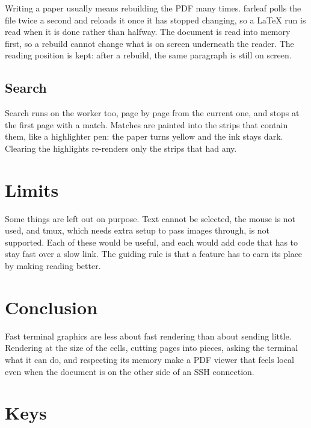 \documentclass[12pt]{article}
\begin{document}
Writing a paper usually means rebuilding the PDF many times. farleaf polls the
file twice a second and reloads it once it has stopped changing, so a LaTeX
run is read when it is done rather than halfway. The document is read into
memory first, so a rebuild cannot change what is on screen underneath the
reader. The reading position is kept: after a rebuild, the same paragraph is
still on screen.

\subsection{Search}

Search runs on the worker too, page by page from the current one, and stops
at the first page with a match. Matches are painted into the strips that
contain them, like a highlighter pen: the paper turns yellow and the ink stays
dark. Clearing the highlights re-renders only the strips that had any.

\section{Limits}

Some things are left out on purpose. Text cannot be selected, the mouse is not
used, and tmux, which needs extra setup to pass images through, is not
supported. Each of these would be useful, and each would add code that has to
stay fast over a slow link. The guiding rule is that a feature has to earn its
place by making reading better.

\section{Conclusion}

Fast terminal graphics are less about fast rendering than about sending
little. Rendering at the size of the cells, cutting pages into pieces, asking
the terminal what it can do, and respecting its memory make a PDF viewer that
feels local even when the document is on the other side of an SSH connection.

\appendix
\section{Keys}
\end{document}
